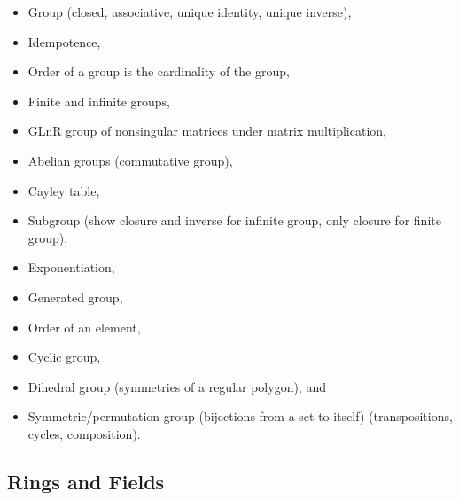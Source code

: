 \begin{itemize}
\tightlist
\item
  Group (closed, associative, unique identity, unique inverse),
\item
  Idempotence,
\item
  Order of a group is the cardinality of the group,
\item
  Finite and infinite groups,
\item
  GLnR group of nonsingular matrices under matrix multiplication,
\item
  Abelian groups (commutative group),
\item
  Cayley table,
\item
  Subgroup (show closure and inverse for infinite group, only closure
  for finite group),
\item
  Exponentiation,
\item
  Generated group,
\item
  Order of an element,
\item
  Cyclic group,
\item
  Dihedral group (symmetries of a regular polygon), and
\item
  Symmetric/permutation group (bijections from a set to itself)
  (transpositions, cycles, composition).
\end{itemize}

\hypertarget{rings-and-fields}{%
\subsection{Rings and Fields}\label{rings-and-fields}}

